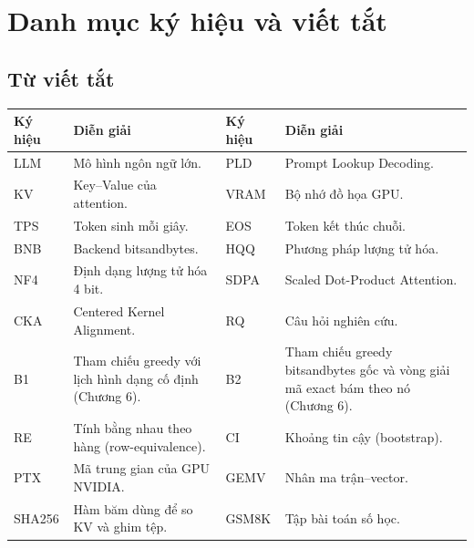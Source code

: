 \chapter*{Danh mục ký hiệu và viết tắt}

\section*{Từ viết tắt}
\small
\begin{longtable}{@{}l p{} l p{}@{}}
\toprule
\textbf{Ký hiệu} & \textbf{Diễn giải} & \textbf{Ký hiệu} & \textbf{Diễn giải} \\
\midrule
LLM & Mô hình ngôn ngữ lớn. & PLD & Prompt Lookup Decoding. \\
KV & Key--Value của attention. & VRAM & Bộ nhớ đồ họa GPU. \\
TPS & Token sinh mỗi giây. & EOS & Token kết thúc chuỗi. \\
BNB & Backend bitsandbytes. & HQQ & Phương pháp lượng tử hóa. \\
NF4 & Định dạng lượng tử hóa 4 bit. & SDPA & Scaled Dot-Product Attention. \\
CKA & Centered Kernel Alignment. & RQ & Câu hỏi nghiên cứu. \\
B1 & Tham chiếu greedy với lịch hình dạng cố định (Chương 6). & B2 & Tham chiếu greedy bitsandbytes gốc và vòng giải mã exact bám theo nó (Chương 6). \\
RE & Tính bằng nhau theo hàng (row-equivalence). & CI & Khoảng tin cậy (bootstrap). \\
PTX & Mã trung gian của GPU NVIDIA. & GEMV & Nhân ma trận--vector. \\
SHA256 & Hàm băm dùng để so KV và ghim tệp. & GSM8K & Tập bài toán số học. \\
\bottomrule
\end{longtable}
\normalsize

